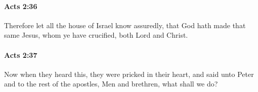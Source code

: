 		\paragraph{Acts 2:36} %
			\label{ACTS-2-36}

			Therefore let all the house of Israel know assuredly, that God hath made that same Jesus, whom ye have crucified, both Lord and Christ.

			\begin{framed}
			\scriptsize
				\begin{compactdesc}
					\item[SBLG] 
				\end{compactdesc}
			\end{framed}

		\paragraph{Acts 2:37} %
			\label{ACTS-2-37}

			Now when they heard this, they were pricked in their heart, and said unto Peter and to the rest of the apostles, Men and brethren, what shall we do?


